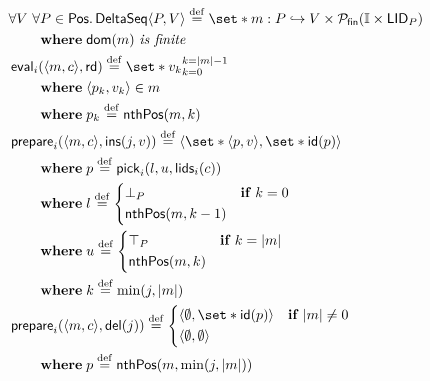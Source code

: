 \begin{figure}[htb]
    \centering
    \begin{align}
    &\begin{aligned}
    \MoveEqLeft\forall V\ \forall P \in \trm{Pos} \qsep \trm{DeltaSeq}\tuple*{P, V} \defeq \set*{m: P \pto V} \times \powerfset{\mathbb{I} \times \trm{LID}_P}\\
    &\where \trm{dom}(m)\ \textit{is finite}
    \end{aligned}\label{eq:deltaseq-state}\\
    &\begin{aligned}
    \MoveEqLeft \trm{eval}_i(\tuple*{m, c}, \trm{rd}) \defeq \set*{v_k}_{k=0}^{k=\card*{m} - 1}\\
    & \where \tuple*{p_k, v_k} \in m\\
    & \where p_k \defeq \trm{nthPos}(m, k)
    \end{aligned}\label{eq:deltaseq-eval}\\
    &\begin{aligned}
    \MoveEqLeft \trm{prepare}_i(\tuple*{m,c}, \trm{ins}(j, v)) \defeq%
    \tuple*{\set*{\tuple*{p, v}}, \set*{\trm{id}(p)}}\\
    &\where p \defeq \trm{pick}_i(l, u, \trm{lids}_i(c))\\
    &\where l \defeq \begin{dcases}
    \bot_P & \when k = 0\\
    \trm{nthPos}(m, k - 1) &
    \end{dcases}\label{eq:deltaseq-ins}\\
    &\where u \defeq \begin{dcases}
    \top_P & \when k = \card*{m}\\
    \trm{nthPos}(m, k) &
    \end{dcases}\\
    &\where k \defeq \min(j, \card*{m})
    \end{aligned}\\
    &\begin{aligned}
    \MoveEqLeft \trm{prepare}_i(\tuple*{m,c}, \trm{del}(j)) \defeq%
    \begin{dcases}
        \tuple*{\emptyset,\set*{\trm{id}(p)}} & \when \card*{m} \neq 0\\
        \tuple*{\emptyset,\emptyset} &
    \end{dcases}\\
    &\where p \defeq \trm{nthPos}(m, \min(j, \card*{m}))
    \end{aligned}\label{eq:deltaseq-del}\\

\end{align}
\end{figure}
